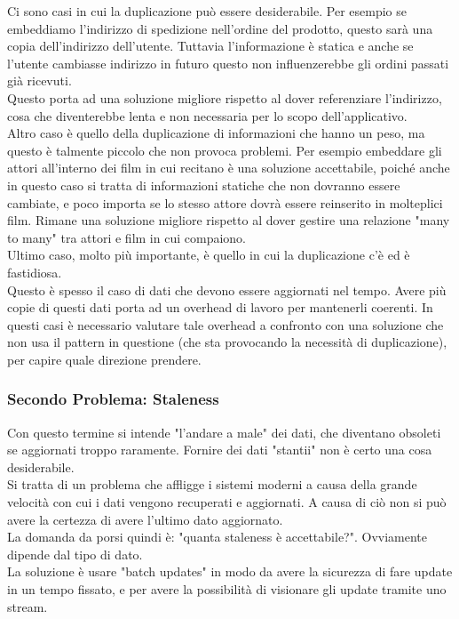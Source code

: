 \noindent Ci sono casi in cui la duplicazione può essere desiderabile. Per esempio se embeddiamo l'indirizzo di spedizione nell'ordine del prodotto, questo sarà una copia dell'indirizzo dell'utente. Tuttavia l'informazione è statica e anche se l'utente cambiasse indirizzo in futuro questo non influenzerebbe gli ordini passati già ricevuti.\\
Questo porta ad una soluzione migliore rispetto al dover referenziare l'indirizzo, cosa che diventerebbe lenta e non necessaria per lo scopo dell'applicativo.\\

\noindent Altro caso è quello della duplicazione di informazioni che hanno un peso, ma questo è talmente piccolo che non provoca problemi. Per esempio embeddare gli attori all'interno dei film in cui recitano è una soluzione accettabile, poiché anche in questo caso si tratta di informazioni statiche che non dovranno essere cambiate, e poco importa se lo stesso attore dovrà essere reinserito in molteplici film. Rimane una soluzione migliore rispetto al dover gestire una relazione "many to many" tra attori e film in cui compaiono.\\

\noindent Ultimo caso, molto più importante, è quello in cui la duplicazione c'è ed è fastidiosa.\\
Questo è spesso il caso di dati che devono essere aggiornati nel tempo. Avere più copie di questi dati porta ad un overhead di lavoro per mantenerli coerenti. In questi casi è necessario valutare tale overhead a confronto con una soluzione che non usa il pattern in questione (che sta provocando la necessità di duplicazione), per capire quale direzione prendere.\\

\subsubsection{Secondo Problema: Staleness}
Con questo termine si intende "l'andare a male" dei dati, che diventano obsoleti se aggiornati troppo raramente. Fornire dei dati "stantii" non è certo una cosa desiderabile.\\
Si tratta di un problema che affligge i sistemi moderni a causa della grande velocità con cui i dati vengono recuperati e aggiornati. A causa di ciò non si può avere la certezza di avere l'ultimo dato aggiornato.\\
La domanda da porsi quindi è: "quanta staleness è accettabile?". Ovviamente dipende dal tipo di dato.\\
La soluzione è usare "batch updates" in modo da avere la sicurezza di fare update in un tempo fissato, e per avere la possibilità di visionare gli update tramite uno stream.\\

